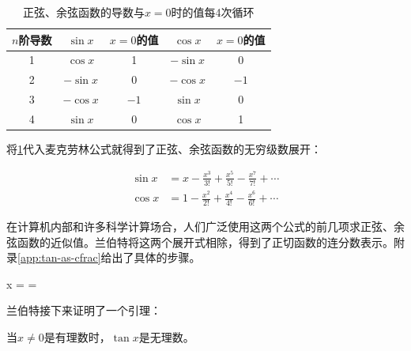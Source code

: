 \documentclass[b5paper]{ctexart}
\begin{document}
\begin{table}[htbp]
  \centering
  \begin{tabular}{|c|c|c||c|c|}
    \hline
    $n$阶导数 & $\sin x$ & $x = 0$的值 & $\cos x$ & $x = 0$的值 \\
    \hline
    1 & $\cos x$  & 1  & $-\sin x$ & 0 \\
    \hline
    2 & $-\sin x$ & 0  & $-\cos x$ & $-1$ \\
    \hline
    3 & $-\cos x$ & $-1$ & $\sin x$  & 0 \\
    \hline
    4 & $\sin x$  & 0  & $\cos x$  & 1 \\
    \hline
  \end{tabular}
  \caption{正弦、余弦函数的导数与$x = 0$时的值每4次循环\label{tab:sin-cos-derivatives}}
\end{table}

将\cref{tab:sin-cos-derivatives}代入麦克劳林公式就得到了正弦、余弦函数的无穷级数展开：

\begin{align}
\sin x &= x - \frac{x^3}{3!} + \frac{x^5}{5!} - \frac{x^7}{7!} + \dotsb \\
\cos x &= 1 - \frac{x^2}{2!} + \frac{x^4}{4!} - \frac{x^6}{6!} + \dotsb
\end{align}

在计算机内部和许多科学计算场合，人们广泛使用这两个公式的前几项求正弦、余弦函数的近似值。兰伯特将这两个展开式相除，得到了正切函数的连分数表示。附录\ref{app:tan-as-cfrac}给出了具体的步骤。

\be
\tan x =  = 
\ee

兰伯特接下来证明了一个引理：

\begin{lemma}
当$x \ne 0$是有理数时，$\tan x$是无理数。
\end{lemma}
\end{document}

